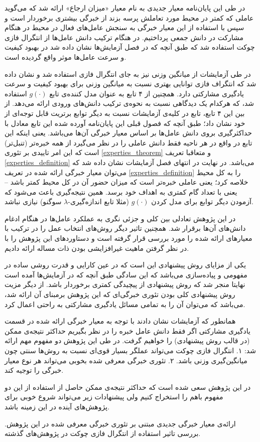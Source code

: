 در طی این پایان‌نامه معیار جدیدی به نام معیار «میزان ارجاع» ارائه شد که می‌گوید عاملی که کمتر در محیط مورد تعاملش پرسه بزند از خبرگی بیشتری برخوردار است و سپس با استفاده از این معیار خبرگی به سنجش عامل‌های فعال در محیط در هنگام مشارکت در دانش جمعی پرداختیم. در هنگام ترکیب دانش عامل‌ها از انتگرال فازی چوکت استفاده شد که طبق آنچه که در فصل آزمایش‌ها نشان‌ داده شد در بهبود کیفیت و سرعت عامل‌ها موثر واقع گردیده است.

در طی آزمایشات از میانگین وزنی نیز به جای انتگرال فازی استفاده شد و نشان داده شد که انتگراف فازی توانایی بهتری نسبت به میانگین وزنی برای بهبود کیفیت و سرعت یادگیری مشارکتی دارد. همچنین از ۴ تابع به عنوان مدل کننده‌ی تابع $g(\cdot)$ استفاده شد، که هرکدام یک دیدگاهی نسبت به نحوه‌ی ترکیب دانش‌های ورودی ارائه می‌دهد. از بین این ۴ تابع، تابع  در کلیه‌ی آزمایشات نسبت به دیگر توابع برتریت قابل توجه‌ای از خود نشان داد؛ طبق آنچه که فصول قبلی این پایان‌نامه آورده شده این تابع معادل با حداکثرگیری بروی دانش عامل‌ها بر اساس معیار خبرگی آن‌ها می‌باشد. یعنی اینکه این تابع در واقع در هر ناحیه فقط دانش عاملی را در نظر می‌گیرد از همه خبره‌تر (تنبل‌تر) است که این امر تاییدی بر تئوری
\ref{experties_theorem}
و متعاقبا تعریف
\ref{experties_definition}
می‌باشد. در نهایت در انتهای فصل آزمایشات نشان داده شد که می‌توان معیار خبرگی ارائه شده در تعریف
\ref{experties_definition}
را به کل محیط خلاصه کرد؛ یعنی عاملی خبره‌تر است که میزان حضور آن در کل محیط کمتر باشد -- یعنی با تعداد گام کمتری به اهداف خود برسد. همین نتیجه‌گیری باعث می‌شود که آزمودن دیگر توابع برای مدل کردن $g(\cdot)$ (مثلا تابع اندازه‌گیری-$\lambda$ سوگنو) نیازی نباشد.

در این پژوهش تعادلی بین کلی و جزئی نگری به عملکرد عامل‌ها در هنگام ادغام دانش‌های آن‌ها برقرار شد. همچنین تاثیر دیگر روش‌های انتخاب عمل را در ترکیب با معیار‌های ارائه شده را مورد بررسی قرار گرفته است و دستاورد‌های این پژوهش را با در نظر گرفتن ماهیت غیرافزایشی بودن ذات مساله ارائه دادیم.

یکی از مزایای روش پیشنهادی این است که در عین کارایی و قدرت روشی ساده در مفهومی و پیاده‌سازی می‌باشد که این سادگی طبق آنچه که در آزمایش‌ها آمده است نهایتا منجر شد که روش پیشنهادی از پیچیدگی کمتری برخوردار باشد. از دیگر مزیت روش پیشنهادی کلی بودن تئوری خبرگی‌ای که این پژوهش برمبنای آن ارائه شد، می‌باشد که می‌توان آن را به تمامی مسائل یادگیری مشارکتی به راحتی اعمال کرد.

همانطور که آزمایشات نشان دادند با توجه به معیار خبرگی ارائه شده در قسمت یادگیری مشارکتی اگر فقط دانش عامل خبره را در نظر بگیریم حداکثر نتیجه‌ی ممکن (در قالب روش پیشنهادی) را خواهیم گرفت. در طی این پژوهش دو مفهوم مهم ارائه شد: ۱. انتگرال فازی چوکت می‌تواند عملگر بسیار قوی‌ای نسبت به روش‌ها سنتی چون میانگین‌گیری وزنی باشد. ۲. تئوری خبرگی معرفی شده بخوبی می‌تواند هر نوع معیار خبرگی را توجیه کند.

در این پژوهش سعی شده است که حداکثر نتیجه‌ی ممکن حاصل از استفاده از این دو مفهوم باهم را استخراج کنیم ولی پیشنهادات زیر می‌تواند شروع خوبی برای پژوهش‌های آینده در این زمینه باشد.

\begin{enumerate}
 ارائه‌ی معیار خبرگی جدیدی مبتنی بر تئوری خبرگی معرفی شده در این پژوهش.
 بررسی تاثیر استفاده از انتگرال فازی چوکت در پژوهش‌های گذشته.
\end{enumerate}
